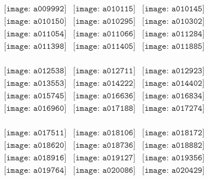 \documentclass{article}
\begin{document}
\begin{figure}[H]
 \begin{center}$
 \begin{array}{cccc}
\texttt{[image: a009992]}&\texttt{[image: a010115]}&\texttt{[image: a010145]}\\\texttt{[image: a010150]}&\texttt{[image: a010295]}&\texttt{[image: a010302]}\\\texttt{[image: a011054]}&\texttt{[image: a011066]}&\texttt{[image: a011284]}\\\texttt{[image: a011398]}&\texttt{[image: a011405]}&\texttt{[image: a011885]}\\
\end{array}$
\end{center}
\end{figure}

\begin{figure}[H]
 \begin{center}$
 \begin{array}{cccc}
\texttt{[image: a012538]}&\texttt{[image: a012711]}&\texttt{[image: a012923]}\\\texttt{[image: a013553]}&\texttt{[image: a014222]}&\texttt{[image: a014402]}\\\texttt{[image: a015745]}&\texttt{[image: a016636]}&\texttt{[image: a016834]}\\\texttt{[image: a016960]}&\texttt{[image: a017188]}&\texttt{[image: a017274]}\\
\end{array}$
\end{center}
\end{figure}

\begin{figure}[H]
 \begin{center}$
 \begin{array}{cccc}
\texttt{[image: a017511]}&\texttt{[image: a018106]}&\texttt{[image: a018172]}\\\texttt{[image: a018620]}&\texttt{[image: a018736]}&\texttt{[image: a018882]}\\\texttt{[image: a018916]}&\texttt{[image: a019127]}&\texttt{[image: a019356]}\\\texttt{[image: a019764]}&\texttt{[image: a020086]}&\texttt{[image: a020429]}\\
\end{array}$
\end{center}
\end{figure}
\end{document}
